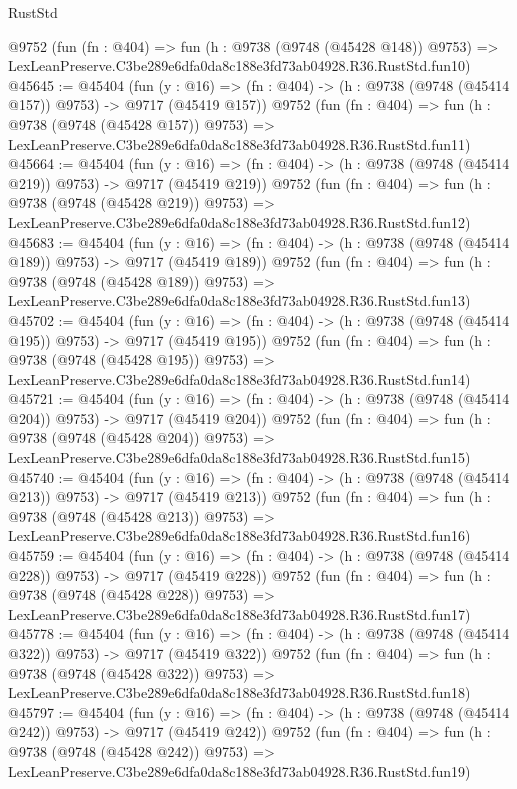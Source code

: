 \begin{lexlean}{RustStd}
\begin{coremodule}
    @9752
    (fun (fn : @404) =>
    fun (h : @9738 (@9748 (@45428 @148)) @9753) =>
    LexLeanPreserve.C3be289e6dfa0da8c188e3fd73ab04928.R36.RustStd.fun10)
@45645 := @45404
    (fun (y : @16) => (fn : @404) -> (h : @9738 (@9748 (@45414 @157)) @9753) -> @9717 (@45419 @157))
    @9752
    (fun (fn : @404) =>
    fun (h : @9738 (@9748 (@45428 @157)) @9753) =>
    LexLeanPreserve.C3be289e6dfa0da8c188e3fd73ab04928.R36.RustStd.fun11)
@45664 := @45404
    (fun (y : @16) => (fn : @404) -> (h : @9738 (@9748 (@45414 @219)) @9753) -> @9717 (@45419 @219))
    @9752
    (fun (fn : @404) =>
    fun (h : @9738 (@9748 (@45428 @219)) @9753) =>
    LexLeanPreserve.C3be289e6dfa0da8c188e3fd73ab04928.R36.RustStd.fun12)
@45683 := @45404
    (fun (y : @16) => (fn : @404) -> (h : @9738 (@9748 (@45414 @189)) @9753) -> @9717 (@45419 @189))
    @9752
    (fun (fn : @404) =>
    fun (h : @9738 (@9748 (@45428 @189)) @9753) =>
    LexLeanPreserve.C3be289e6dfa0da8c188e3fd73ab04928.R36.RustStd.fun13)
@45702 := @45404
    (fun (y : @16) => (fn : @404) -> (h : @9738 (@9748 (@45414 @195)) @9753) -> @9717 (@45419 @195))
    @9752
    (fun (fn : @404) =>
    fun (h : @9738 (@9748 (@45428 @195)) @9753) =>
    LexLeanPreserve.C3be289e6dfa0da8c188e3fd73ab04928.R36.RustStd.fun14)
@45721 := @45404
    (fun (y : @16) => (fn : @404) -> (h : @9738 (@9748 (@45414 @204)) @9753) -> @9717 (@45419 @204))
    @9752
    (fun (fn : @404) =>
    fun (h : @9738 (@9748 (@45428 @204)) @9753) =>
    LexLeanPreserve.C3be289e6dfa0da8c188e3fd73ab04928.R36.RustStd.fun15)
@45740 := @45404
    (fun (y : @16) => (fn : @404) -> (h : @9738 (@9748 (@45414 @213)) @9753) -> @9717 (@45419 @213))
    @9752
    (fun (fn : @404) =>
    fun (h : @9738 (@9748 (@45428 @213)) @9753) =>
    LexLeanPreserve.C3be289e6dfa0da8c188e3fd73ab04928.R36.RustStd.fun16)
@45759 := @45404
    (fun (y : @16) => (fn : @404) -> (h : @9738 (@9748 (@45414 @228)) @9753) -> @9717 (@45419 @228))
    @9752
    (fun (fn : @404) =>
    fun (h : @9738 (@9748 (@45428 @228)) @9753) =>
    LexLeanPreserve.C3be289e6dfa0da8c188e3fd73ab04928.R36.RustStd.fun17)
@45778 := @45404
    (fun (y : @16) => (fn : @404) -> (h : @9738 (@9748 (@45414 @322)) @9753) -> @9717 (@45419 @322))
    @9752
    (fun (fn : @404) =>
    fun (h : @9738 (@9748 (@45428 @322)) @9753) =>
    LexLeanPreserve.C3be289e6dfa0da8c188e3fd73ab04928.R36.RustStd.fun18)
@45797 := @45404
    (fun (y : @16) => (fn : @404) -> (h : @9738 (@9748 (@45414 @242)) @9753) -> @9717 (@45419 @242))
    @9752
    (fun (fn : @404) =>
    fun (h : @9738 (@9748 (@45428 @242)) @9753) =>
    LexLeanPreserve.C3be289e6dfa0da8c188e3fd73ab04928.R36.RustStd.fun19)

\end{coremodule}
\end{lexlean}
